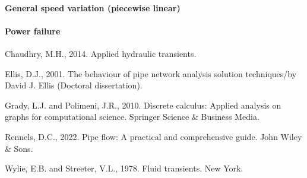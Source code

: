 \documentclass[12pt]{article}
\begin{document}
\paragraph{General speed variation (piecewise linear)}

\paragraph{Power failure}





\begin{thebibliography}{9}
 Chaudhry, M.H., 2014. Applied hydraulic transients.

 Ellis, D.J., 2001. The behaviour of pipe network analysis solution techniques/by David J. Ellis (Doctoral dissertation).

 Grady, L.J. and Polimeni, J.R., 2010. Discrete calculus: Applied analysis on graphs for computational science. Springer Science \& Business Media.

 Rennels, D.C., 2022. Pipe flow: A practical and comprehensive guide. John Wiley \& Sons.

 Wylie, E.B. and Streeter, V.L., 1978. Fluid transients. New York.

\end{thebibliography}
\end{document}

